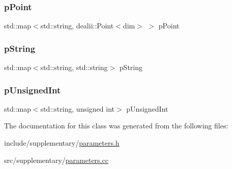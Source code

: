 \mbox{\label{classparameters_class_a619a83b172e412339a12ea402580662c}} 
\subsubsection{\texorpdfstring{p\+Point}{pPoint}}
{\footnotesize\ttfamily std\+::map$<$std\+::string, dealii\+::\+Point$<$dim$>$ $>$ p\+Point\hspace{0.3cm}{\ttfamily [private]}}

\mbox{\label{classparameters_class_a3453601308e73bcc0f45ed6ea8a9959b}} 
\subsubsection{\texorpdfstring{p\+String}{pString}}
{\footnotesize\ttfamily std\+::map$<$std\+::string, std\+::string$>$ p\+String\hspace{0.3cm}{\ttfamily [private]}}

\mbox{\label{classparameters_class_a997bcb31fee3242f776c7e05d709ce12}} 
\subsubsection{\texorpdfstring{p\+Unsigned\+Int}{pUnsignedInt}}
{\footnotesize\ttfamily std\+::map$<$std\+::string, unsigned int$>$ p\+Unsigned\+Int\hspace{0.3cm}{\ttfamily [private]}}



The documentation for this class was generated from the following files\+:\begin{DoxyCompactItemize}
\item 
include/supplementary/\mbox{\hyperlink{parameters_8h}{parameters.\+h}}\item 
src/supplementary/\mbox{\hyperlink{parameters_8cc}{parameters.\+cc}}\end{DoxyCompactItemize}
